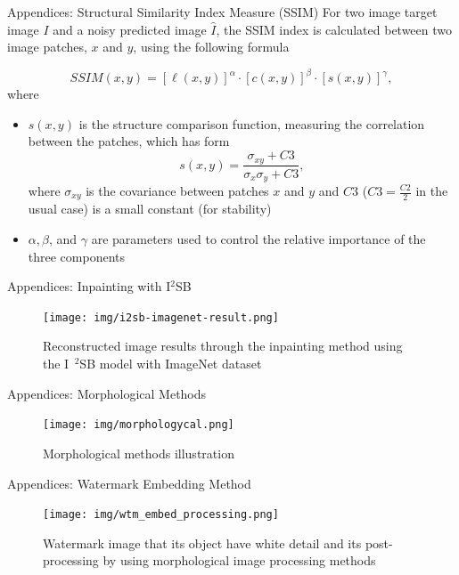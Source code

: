 \begin{frame}{Appendices: Structural Similarity Index Measure (SSIM)}
For two image target image $I$ and a noisy predicted image $\hat{I}$, the SSIM index is calculated between two image patches, $x$ and $y$, using the following formula

\begin{equation}
    SSIM(x, y) = [\ell(x, y)]^\alpha \cdot [c(x, y)]^\beta \cdot [s(x, y)]^\gamma,
\end{equation}
where
\begin{itemize}
    \item $s(x, y)$ is the structure comparison function, measuring the correlation between the patches, which has form
          \begin{equation*}
              s(x, y) = \frac{\sigma_{xy} + C3}{\sigma_x \sigma_y + C3},
          \end{equation*}
          where $\sigma_{xy}$ is the covariance between patches $x$ and $y$ and $C3$ ($C3=\frac{C2}{2}$ in the usual case) is a small constant (for stability)
    \item $\alpha, \beta$, and $\gamma$ are parameters used to control the relative importance of the three components
\end{itemize}
\end{frame}

\begin{frame}{Appendices: Inpainting with I$^2$SB}
\begin{figure}
    \centering
    \texttt{[image: img/i2sb-imagenet-result.png]}
    \caption{Reconstructed image results through the inpainting method using the I$^{\text{ }2}$SB model with ImageNet dataset}
\end{figure}
\end{frame}

\begin{frame}{Appendices: Morphological Methods}
\begin{figure}[t]
    \centering
    \texttt{[image: img/morphologycal.png]}
    \caption{Morphological methods illustration}
    \label{fig:morphological}
\end{figure}
\end{frame}

\begin{frame}{Appendices: Watermark Embedding Method}
\begin{figure}[t]
    \centering
    \texttt{[image: img/wtm\_embed\_processing.png]}
    \caption[Watermark image morphological image processing methods]{Watermark image that its object have white detail and its post-processing by using morphological image processing methods}
    \label{fig:wtm-with-white-detail}
\end{figure}
\end{frame}

